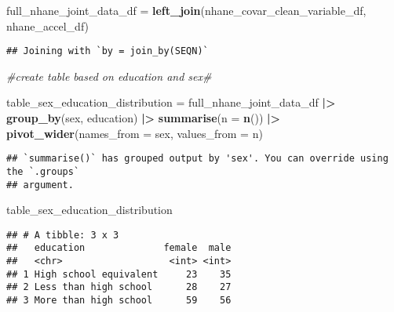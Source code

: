 \documentclass[
]{article}
\newenvironment{Shaded}{\begin{snugshade}}{\end{snugshade}}
\newcommand{\AttributeTok}[1]{\textcolor[rgb]{0.13,0.29,0.53}{#1}}
\newcommand{\CommentTok}[1]{\textcolor[rgb]{0.56,0.35,0.01}{\textit{#1}}}
\newcommand{\FunctionTok}[1]{\textcolor[rgb]{0.13,0.29,0.53}{\textbf{#1}}}
\newcommand{\NormalTok}[1]{#1}
\newcommand{\OtherTok}[1]{\textcolor[rgb]{0.56,0.35,0.01}{#1}}
\newcommand{\SpecialCharTok}[1]{\textcolor[rgb]{0.81,0.36,0.00}{\textbf{#1}}}
\begin{document}
\begin{Shaded}
\begin{Highlighting}[]
\NormalTok{full\_nhane\_joint\_data\_df }\OtherTok{=} \FunctionTok{left\_join}\NormalTok{(nhane\_covar\_clean\_variable\_df, nhane\_accel\_df)}
\end{Highlighting}
\end{Shaded}

\begin{verbatim}
## Joining with `by = join_by(SEQN)`
\end{verbatim}

\begin{Shaded}
\begin{Highlighting}[]
\CommentTok{\#create table based on education and sex\#}

\NormalTok{table\_sex\_education\_distribution }\OtherTok{=}\NormalTok{ full\_nhane\_joint\_data\_df }\SpecialCharTok{|\textgreater{}} \FunctionTok{group\_by}\NormalTok{(sex, education) }\SpecialCharTok{|\textgreater{}}
  \FunctionTok{summarise}\NormalTok{(}\AttributeTok{n =} \FunctionTok{n}\NormalTok{()) }\SpecialCharTok{|\textgreater{}} \FunctionTok{pivot\_wider}\NormalTok{(}\AttributeTok{names\_from =}\NormalTok{ sex, }\AttributeTok{values\_from =}\NormalTok{ n)}
\end{Highlighting}
\end{Shaded}

\begin{verbatim}
## `summarise()` has grouped output by 'sex'. You can override using the `.groups`
## argument.
\end{verbatim}

\begin{Shaded}
\begin{Highlighting}[]
\NormalTok{table\_sex\_education\_distribution}
\end{Highlighting}
\end{Shaded}

\begin{verbatim}
## # A tibble: 3 x 3
##   education              female  male
##   <chr>                   <int> <int>
## 1 High school equivalent     23    35
## 2 Less than high school      28    27
## 3 More than high school      59    56
\end{verbatim}
\end{document}
